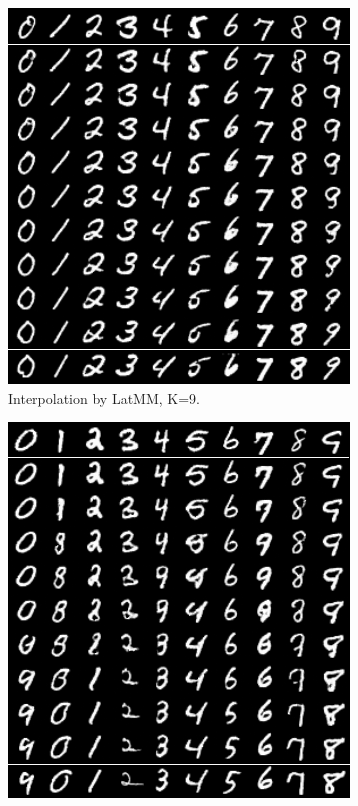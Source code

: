 \begin{figure}[!t]
\begin{subfigure}[b]{0.3\textwidth}
    \includegraphics[width=1\linewidth]{images/mnist/interpolation/LatMMK9interpo_sample_grid.png}
    \caption{Interpolation by LatMM, K=9.}\label{fig-interpo-latmm1}
  \end{subfigure}
  \hspace{10pt}
  \begin{subfigure}[b]{0.3\textwidth}
    \centering
    \includegraphics[width=1\linewidth]{images/mnist/interpolation/interpoMNIST_heter_LatMM_K9_sample_grid.png}

\end{subfigure}
\end{figure}
